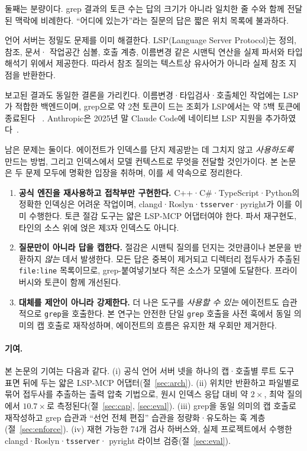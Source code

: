 \documentclass[11pt]{article}
\begin{document}
둘째는 분량이다. grep 결과의 토큰 수는 답의 크기가 아니라 일치한 줄 수와 함께 전달된 맥락에
비례한다. ``어디에 있는가''라는 질문의 답은 짧은 위치 목록에 불과하다.

언어 서버는 정밀도 문제를 이미 해결한다. LSP(Language Server Protocol)는 정의, 참조, 문서·
작업공간 심볼, 호출 계층, 이름변경 같은 시맨틱 연산을 실제 파서와 타입 해석기 위에서 제공한다.
따라서 참조 질의는 텍스트상 유사어가 아니라 실제 참조 지점을 반환한다.

보고된 결과도 동일한 결론을 가리킨다. 이름변경·타입검사·호출체인 작업에는 LSP가 적합한
백엔드이며, grep으로 약 2천 토큰이 드는 조회가 LSP에서는 약 5백 토큰에 종료된다
~\cite{lsp-medium,semble-hn}. Anthropic은 2025년 말 Claude Code에 네이티브 LSP 지원을
추가하였다~\cite{anthropic-lsp}.

남은 문제는 둘이다. 에이전트가 인덱스를 단지 제공받는 데 그치지 않고 \emph{사용하도록} 만드는
방법, 그리고 인덱스에서 모델 컨텍스트로 무엇을 전달할 것인가이다. 본 논문은 두 문제 모두에
명확한 입장을 취하며, 이를 세 약속으로 정리한다.

\begin{enumerate}
  \item \textbf{공식 엔진을 재사용하고 접착부만 구현한다.} C++·C\#·TypeScript·Python의
  정확한 인덱싱은 어려운 작업이며, clangd·Roslyn·\texttt{tsserver}·pyright가 이를 이미
  수행한다. 토큰 절감 도구는 얇은 LSP-MCP 어댑터여야 한다. 파서 재구현도, 타인의 소스 위에
  얹은 제3자 인덱스도 아니다.

  \item \textbf{질문만이 아니라 답을 캡한다.} 절감은 시맨틱 질의를 던지는 것만큼이나 본문을
  반환하지 \emph{않는} 데서 발생한다. 모든 답은 중복이 제거되고 디렉터리 접두사가 추출된
  \texttt{file:line} 목록이므로, grep-붙여넣기보다 적은 소스가 모델에 도달한다. 프라이버시와
  토큰이 함께 개선된다.

  \item \textbf{대체를 제안이 아니라 강제한다.} 더 나은 도구를 \emph{사용할 수 있는}
  에이전트도 습관적으로 \texttt{grep}을 호출한다. 본 연구는 안전한 단일 \texttt{grep} 호출을
  사전 훅에서 동일 의미의 캡 호출로 재작성하며, 에이전트의 흐름은 유지한 채 우회만 제거한다.
\end{enumerate}

\paragraph{기여.}
본 논문의 기여는 다음과 같다. (i) 공식 언어 서버 넷을 하나의 캡·호출별 루트 도구 표면 뒤에
두는 얇은 LSP-MCP 어댑터(절~\ref{sec:arch}). (ii) 위치만 반환하고 파일별로 묶어 접두사를
추출하는 출력 압축 기법으로, 원시 인덱스 응답 대비 약 $2\times$, 최악 질의에서 $10.7\times$로
측정된다(절~\ref{sec:cap}, \ref{sec:eval}). (iii) grep을 동일 의미의 캡 호출로 재작성하고
grep 습관과 ``선언 전체 편집'' 습관을 정량화·유도하는 훅 계층(절~\ref{sec:enforce}). (iv)
재현 가능한 74개 검사 하버스와, 실제 프로젝트에서 수행한 clangd·Roslyn·\texttt{tsserver}·
pyright 라이브 검증(절~\ref{sec:eval}).
\end{document}
